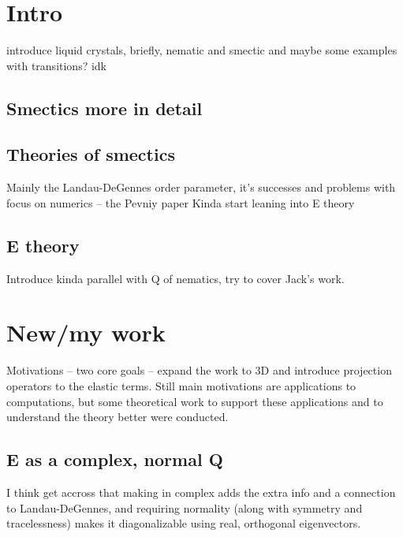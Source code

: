 \documentclass[11pt]{article}
\begin{document}
\section{Intro}
introduce liquid crystals, briefly, nematic and smectic and maybe some examples with transitions? idk
\subsection{Smectics more in detail}
\subsection{Theories of smectics}
Mainly the Landau-DeGennes order parameter, it's successes and problems with focus on numerics -- the Pevniy paper
Kinda start leaning into E theory
\subsection{E theory}
Introduce kinda parallel with Q of nematics, try to cover Jack's work.

\section{New/my work}
Motivations -- two core goals -- expand the work to 3D and introduce projection operators to the elastic terms.
Still main motivations are applications to computations, but some theoretical work to support these applications and to understand the theory better were conducted.

\subsection{E as a complex, normal Q}
I think get accross that making in complex adds the extra info and a connection to Landau-DeGennes, and requiring normality (along with symmetry and tracelessness) makes it diagonalizable using real, orthogonal eigenvectors.
\end{document}
